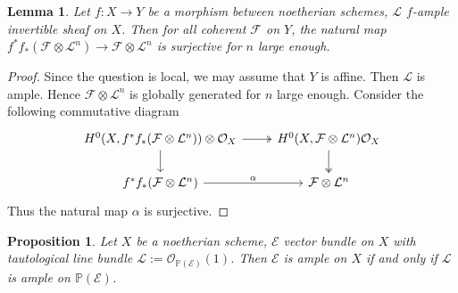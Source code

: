 \documentclass{ctexart}
\newtheorem{proposition}{Proposition}[section]
\newtheorem{lemma}{Lemma}[section]
\begin{document}
\begin{lemma}
    Let $f: X \rightarrow Y$ be a morphism between noetherian schemes, $\mathcal{L}$ $f$-ample invertible sheaf on $X$.
    Then for all coherent $\mathcal{F}$ on $Y$, the natural map $f^{\ast}f_{\ast}(\mathcal{F} \otimes \mathcal{L}^{n}) \rightarrow \mathcal{F} \otimes \mathcal{L}^{n}$ is surjective for $n$ large enough.
    \label{Lemma 4.3}
\end{lemma}
\begin{proof}
    Since the question is local, we may assume that $Y$ is affine.
    Then $\mathcal{L}$ is ample.
    Hence $\mathcal{F} \otimes \mathcal{L}^{n}$ is globally generated for $n$ large enough.
    Consider the following commutative diagram
    \begin{equation}
        \begin{tikzcd}
            H^{0}(X, f^{\ast}f_{\ast}(\mathcal{F} \otimes \mathcal{L}^{n})) \otimes \mathcal{O}_{X} \arrow[r, twoheadrightarrow] \arrow[d] &
            H^{0}(X, \mathcal{F} \otimes \mathcal{L}^{n}) \mathcal{O}_{X} \arrow[d, twoheadrightarrow] \\
            f^{\ast}f_{\ast}(\mathcal{F} \otimes \mathcal{L}^{n}) \arrow[r, "\alpha"] &
            \mathcal{F} \otimes \mathcal{L}^{n}
        \end{tikzcd}
    \end{equation}
    Thus the natural map $\alpha$ is surjective.
\end{proof}
\begin{proposition}
    Let $X$ be a noetherian scheme, $\mathcal{E}$ vector bundle on $X$ with tautological line bundle $\mathcal{L} := \mathcal{O}_{\mathbb{P}(\mathcal{E})}(1)$.
    Then $\mathcal{E}$ is ample on $X$ if and only if $\mathcal{L}$ is ample on $\mathbb{P}(\mathcal{E})$.
    \label{Proposition 4.11}
\end{proposition}
\end{document}
